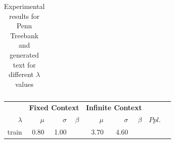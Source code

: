 \documentclass[11pt,a4paper]{article}
\newcommand{\note}[4][]{\todo[author=#2,color=#3,size=\scriptsize,fancyline,caption={},#1]{#4}} %
\newcommand{\phu}[2][]{\note[#1]{Phu}{violet!40}{#2}}
\newcommand{\Phu}[2][]{\phu[inline,#1]{#2}}   %
\begin{document}
\begin{table}[hbt!]
\begin{tabular}{rrrrrrrrr}

 \bottomrule
    \end{tabular}
    \caption{Experimental results for Penn Treebank and generated text for different $\lambda$  values}
     \label{tab:1}
\end{table}
\begin{table}[hbt!]
\small
\centering
    \begin{tabular}{rrrrrrrrr}%
     \toprule
      & \multicolumn{3}{c}{\textbf{Fixed Context}}
          & \multicolumn{3}{c}{\textbf{Infinite Context} } & \multicolumn{1}{c}{}  \\
    \textbf{$\lambda$}  & \textbf{$\mu$} & \textbf{$\sigma$}  & \textbf{$\beta$} & \textbf{$\mu$} & \textbf{$\sigma$}  & \textbf{$\beta$} &   \textbf{$Ppl.$}\\
      \midrule

train & 0.80 & 1.00 &  & 3.70 & 4.60 &  &  \\


\end{tabular}
\end{table}
\end{document}
